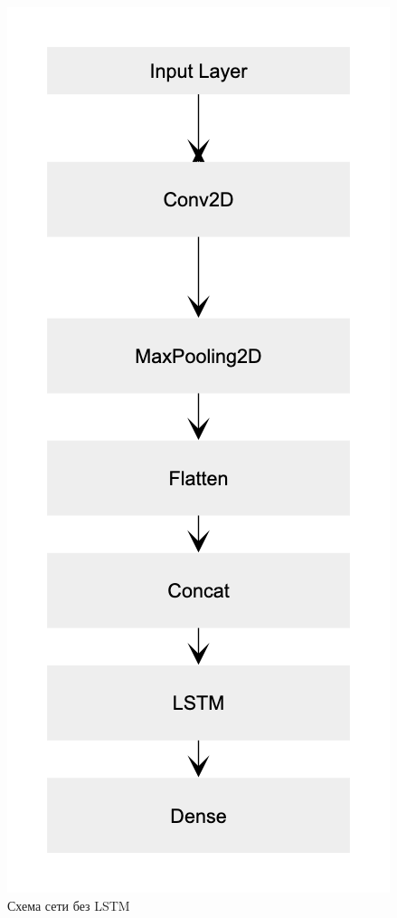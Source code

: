 \documentclass[12pt, a4paper, titlepage]{extreport}
\begin{document}
	\includegraphics[scale=0.5]{layers.png}
	\\
	Схема сети без LSTM
	\\
\end{document}
